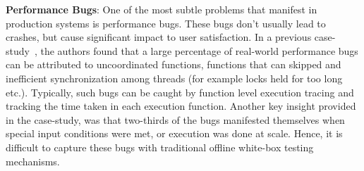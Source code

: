 \noindent
\textbf{Performance Bugs}: One of the most subtle problems that manifest in production systems is performance bugs.
These bugs don't usually lead to crashes, but cause significant impact to user satisfaction.
In a previous case-study~\cite{shanluPerf}, the authors found that a large percentage of real-world performance bugs can be attributed to uncoordinated functions, functions that can skipped and inefficient synchronization among threads (for example locks held for too long etc.).
Typically, such bugs can be caught by function level execution tracing and tracking the time taken in each execution function.
Another key insight provided in the case-study, was that two-thirds of the bugs manifested themselves when special input conditions were met, or execution was done at scale. 
Hence, it is difficult to capture these bugs with traditional offline white-box testing mechanisms.

